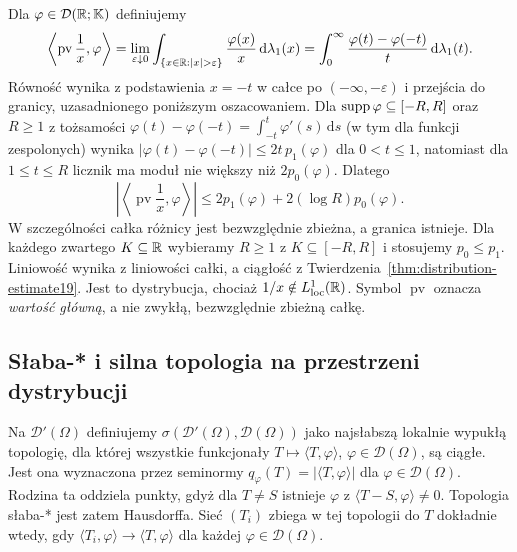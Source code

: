 \begin{przyklad}
\label{ex:principal-value19}
Dla $\varphi\in\mathcal D(\mathbb R;\mathbb K)$ definiujemy
\[\left\langle\operatorname{pv}\frac1x,\varphi\right\rangle
=\lim_{\varepsilon\downarrow0}
\int_{\{x\in\R:|x|>\varepsilon\}}
\frac{\varphi(x)}{x}\,\mathrm d\lambda_1(x)
=\int_0^\infty\frac{\varphi(t)-\varphi(-t)}{t}\,
\mathrm d\lambda_1(t).\]
Równość wynika z podstawienia $x=-t$ w całce
po $(-\infty,-\varepsilon)$ i przejścia do granicy,
uzasadnionego poniższym oszacowaniem.
Dla $\operatorname{supp}\varphi\subseteq[-R,R]$ oraz $R\ge1$
z tożsamości $\varphi(t)-\varphi(-t)=\int_{-t}^t\varphi'(s)\,\mathrm ds$
(w tym dla funkcji zespolonych) wynika
$|\varphi(t)-\varphi(-t)|\le2t\,p_1(\varphi)$ dla
$0<t\le1$, natomiast dla $1\le t\le R$ licznik
ma moduł nie większy niż $2p_0(\varphi)$. Dlatego
\[\left|\left\langle\operatorname{pv}\frac1x,
\varphi\right\rangle\right|\le
2p_1(\varphi)+2(\log R)p_0(\varphi).\]
W szczególności całka różnicy jest bezwzględnie zbieżna,
a granica istnieje. Dla każdego zwartego $K\subseteq\mathbb R$
wybieramy $R\ge1$ z $K\subseteq[-R,R]$ i stosujemy
$p_0\le p_1$. Liniowość wynika z liniowości całki,
a ciągłość z Twierdzenia~\ref{thm:distribution-estimate19}.
Jest to dystrybucja, chociaż $1/x\notin L^1_{\mathrm{loc}}(\mathbb R)$.
Symbol $\operatorname{pv}$ oznacza \emph{wartość główną},
a nie zwykłą, bezwzględnie zbieżną całkę.
\end{przyklad}

\subsection{Słaba-* i silna topologia na przestrzeni dystrybucji}

\begin{definicja}
\label{def:weakstar19}
Na $\mathcal D'(\Omega)$ definiujemy
$\sigma(\mathcal D'(\Omega),\mathcal D(\Omega))$ jako
najsłabszą lokalnie wypukłą topologię, dla której
wszystkie funkcjonały $T\mapsto\langle T,\varphi\rangle$,
$\varphi\in\mathcal D(\Omega)$, są ciągłe.
Jest ona wyznaczona przez seminormy
$q_\varphi(T)=|\langle T,\varphi\rangle|$ dla $\varphi\in\mathcal D(\Omega)$.
Rodzina ta oddziela punkty, gdyż dla $T\ne S$ istnieje
$\varphi$ z $\langle T-S,\varphi\rangle\ne0$.
Topologia słaba-* jest zatem Hausdorffa.
Sieć $(T_i)$ zbiega w tej topologii do $T$ dokładnie wtedy,
gdy $\langle T_i,\varphi\rangle\to\langle T,\varphi\rangle$
dla każdej $\varphi\in\mathcal D(\Omega)$.
\end{definicja}

